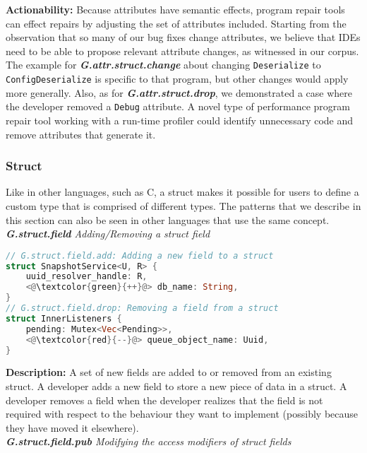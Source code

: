 \noindent\textbf{Actionability:} Because attributes have semantic effects, program repair tools can effect repairs by adjusting the set of attributes included. Starting from the observation that so many of our bug fixes change attributes, we believe that IDEs need to be able to propose relevant attribute changes, as witnessed in our corpus. The example for \textit{\textbf{G.attr.struct.change}} about changing \verb+Deserialize+ to \verb+ConfigDeserialize+ is specific to that program, but other changes would apply more generally. Also, as for \textit{\textbf{G.attr.struct.drop}}, we demonstrated a case where the developer removed a \verb+Debug+ attribute. A novel type of performance program repair tool working with a run-time profiler could identify unnecessary code and remove attributes that generate it. 

\subsubsection{Struct} 

Like in other languages, such as C, a struct makes it possible for users to define a custom type that is comprised of different types. The patterns that we describe in this section can also be seen in other languages that use the same concept. \\

\noindent\textit{\textbf{G.struct.field} Adding/Removing a struct field}

\begin{lstlisting}[language=Rust, style=colouredRust]
// G.struct.field.add: Adding a new field to a struct
struct SnapshotService<U, R> {
    uuid_resolver_handle: R,
    <@\textcolor{green}{++}@> db_name: String,
}
// G.struct.field.drop: Removing a field from a struct
struct InnerListeners {
    pending: Mutex<Vec<Pending>>,
    <@\textcolor{red}{--}@> queue_object_name: Uuid,
}

\end{lstlisting}

\noindent\textbf{Description:} A set of new fields are added to or removed from an existing struct. A developer adds a new field to store a new piece of data in a struct. A developer removes a field when the developer realizes that the field is not required with respect to the behaviour they want to implement (possibly because they have moved it elsewhere). \\

\noindent\textit{\textbf{G.struct.field.pub} Modifying the access modifiers of struct fields}

